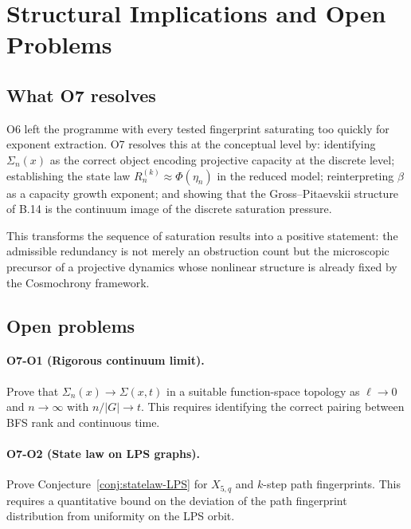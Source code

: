 \documentclass[11pt,a4paper]{article}
\theoremstyle{definition}
\theoremstyle{remark}
\begin{document}
  \section{Structural Implications and Open Problems}
  \label{sec:structural}

  \subsection{What O7 resolves}
    \label{ssec:resolves}

    O6 left the programme with every tested fingerprint saturating too quickly for exponent
    extraction.
    O7 resolves this at the conceptual level by:
    identifying $\Sigma_n(x)$ as the correct object encoding projective capacity at the discrete level;
    establishing the state law $R_n^{(k)} \approx \Phi(\eta_n)$ in the reduced model;
    reinterpreting $\beta$ as a capacity growth exponent; and
    showing that the Gross--Pitaevskii structure of B.14 is the continuum image of the
    discrete saturation pressure.

    This transforms the sequence of saturation results into a positive statement:
    the admissible redundancy is not merely an obstruction count but the microscopic precursor
    of a projective dynamics whose nonlinear structure is already fixed by the Cosmochrony framework.

  \subsection{Open problems}
    \label{ssec:open}

    \paragraph{O7-O1 (Rigorous continuum limit).}
      Prove that $\Sigma_n(x) \to \Sigma(x,t)$ in a suitable function-space topology as
      $\ell \to 0$ and $n \to \infty$ with $n/|G| \to t$.
      This requires identifying the correct pairing between BFS rank and continuous time.

    \paragraph{O7-O2 (State law on LPS graphs).}
      Prove Conjecture~\ref{conj:statelaw-LPS} for $X_{5,q}$ and $k$-step path fingerprints.
      This requires a quantitative bound on the deviation of the path fingerprint distribution
      from uniformity on the LPS orbit.
\end{document}
